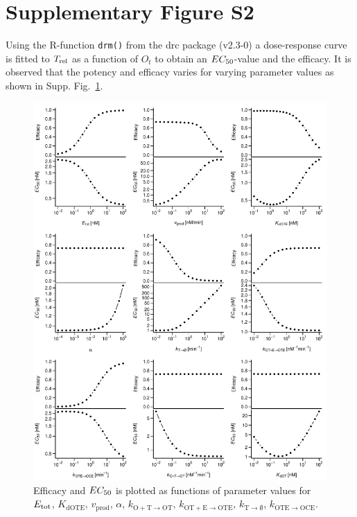 \documentclass[a4paper,11pt]{article}
\newenvironment{Ncenter}{%
  \setlength\topsep{-10pt}
  \setlength\parskip{-10pt}
  \begin{center}
}{%
  \end{center}
}
\newcommand{\kOpT}{k_{\mathrm{O+T \to OT}}}
\newcommand{\kt}{k_{\mathrm{OT+E \to OTE}}}
\newcommand{\kE}{k_{\mathrm{OTE \to OCE}}}
\newcommand{\vp}{v_{\mathrm{prod}}}
\newcommand{\vd}{k_{\mathrm{T \to \emptyset}}}
\newcommand{\Trel}{T_{\rm{rel}}}
\newcommand{\EC}{EC_{\rm{50}}}
\newcommand{\KdOTE}{K_{\mathrm{dOTE}}}
\begin{document}
\section{Supplementary Figure S2}
Using the R-function \texttt{drm()} from the drc package (v2.3-0) a dose-response curve is fitted to $\Trel$ as a function of $O_t$ to obtain an $\EC$-value and the efficacy. It is observed that the potency and efficacy varies for varying parameter values as shown in Supp. Fig.~\ref{fig:EP}.
\begin{figure}[!h]
\begin{Ncenter}
\includegraphics[width=\textwidth]{SuppFile1-Efficacy.pdf}
\end{Ncenter}
\caption{Efficacy and $\EC$ is plotted as functions of parameter values for $E_{\rm{tot}}$, $\KdOTE$, $\vp$, $\alpha$, $\kOpT$, $\kt$, $\vd$, $\kE$. }\label{fig:EP}
\end{figure}
\end{document}
